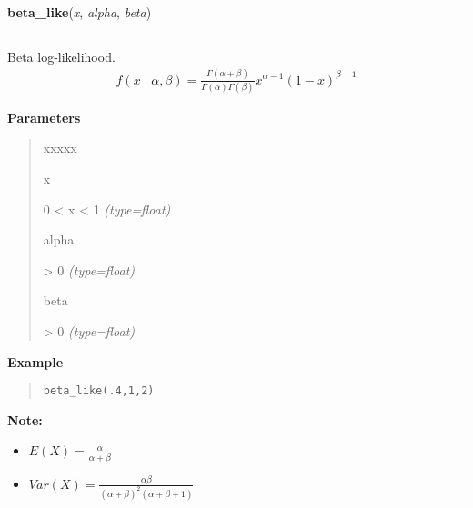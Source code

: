     \begin{boxedminipage}{\textwidth}

    \raggedright \textbf{beta\_like}(\textit{x}, \textit{alpha}, \textit{beta})

    \vspace{-1.5ex}

    \rule{\textwidth}{0.5\fboxrule}

Beta log-likelihood.
\begin{equation*}\begin{split}f(x \mid \alpha, \beta) = \frac{\Gamma(\alpha + \beta)}{\Gamma(\alpha) \Gamma(\beta)} x^{\alpha - 1} (1 - x)^{\beta - 1}\end{split}\end{equation*}    \vspace{1ex}

      \textbf{Parameters}
      \begin{quote}
        \begin{Ventry}{xxxxx}

          \item[x]


0 {\textless} x {\textless} 1
            \textit{(type=float)}

          \item[alpha]


{\textgreater} 0
            \textit{(type=float)}

          \item[beta]


{\textgreater} 0
            \textit{(type=float)}

        \end{Ventry}

      \end{quote}

    \vspace{1ex}

      \textbf{Example}
      \begin{quote}
          \begin{alltt}
\pysrcprompt{{\textgreater}{\textgreater}{\textgreater} }beta\_like(.4,1,2)
\end{alltt}
      \end{quote}

    \vspace{1ex}

\textbf{Note:} \begin{itemize}
\item {} 
$E(X)=\frac{\alpha}{\alpha+\beta}$

\item {} 
$Var(X)=\frac{\alpha \beta}{(\alpha+\beta)^2(\alpha+\beta+1)}$

\end{itemize}


    \end{boxedminipage}

